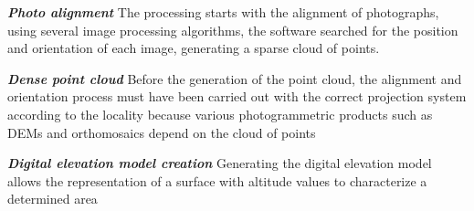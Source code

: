 \textit{\textbf{Photo alignment}} \newline
The processing starts with the alignment of photographs, using several image processing algorithms, the software searched for the position and orientation of each image, generating a sparse cloud of points.

\textit{\textbf{Dense point cloud}} \newline
Before the generation of the point cloud, the alignment and orientation process must have been carried out with the correct projection system according to the locality because various photogrammetric products such as DEMs and orthomosaics depend on the cloud of points 

\textit{\textbf{Digital elevation model creation}} \newline
Generating the digital elevation model allows the representation of a surface with altitude values to characterize a determined area
